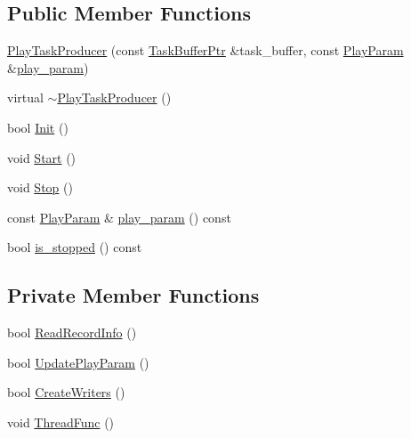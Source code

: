 \subsection*{Public Member Functions}
\begin{DoxyCompactItemize}
\item 
\hyperlink{classapollo_1_1cyber_1_1record_1_1PlayTaskProducer_a66e6a04b3f690355e593465aeb9ef1e0}{Play\-Task\-Producer} (const \hyperlink{classapollo_1_1cyber_1_1record_1_1PlayTaskProducer_a1a4a252c8c244a445f580a9c768c017d}{Task\-Buffer\-Ptr} \&task\-\_\-buffer, const \hyperlink{structapollo_1_1cyber_1_1record_1_1PlayParam}{Play\-Param} \&\hyperlink{classapollo_1_1cyber_1_1record_1_1PlayTaskProducer_a39ca7aec4622d5cd4abdc8805748ba7d}{play\-\_\-param})
\item 
virtual \hyperlink{classapollo_1_1cyber_1_1record_1_1PlayTaskProducer_a4dbc2e89ca8c92782ff8d4a527b17ed4}{$\sim$\-Play\-Task\-Producer} ()
\item 
bool \hyperlink{classapollo_1_1cyber_1_1record_1_1PlayTaskProducer_a2dfd444aad1c481bddda51d5d5b4e4f1}{Init} ()
\item 
void \hyperlink{classapollo_1_1cyber_1_1record_1_1PlayTaskProducer_a9f2d67183e461ff515a3dc10a9a0426e}{Start} ()
\item 
void \hyperlink{classapollo_1_1cyber_1_1record_1_1PlayTaskProducer_a158e6eaad01b4e2a0e7492582d135724}{Stop} ()
\item 
const \hyperlink{structapollo_1_1cyber_1_1record_1_1PlayParam}{Play\-Param} \& \hyperlink{classapollo_1_1cyber_1_1record_1_1PlayTaskProducer_a39ca7aec4622d5cd4abdc8805748ba7d}{play\-\_\-param} () const 
\item 
bool \hyperlink{classapollo_1_1cyber_1_1record_1_1PlayTaskProducer_a4c0a12788529f3146a9f474030e4fca3}{is\-\_\-stopped} () const 
\end{DoxyCompactItemize}
\subsection*{Private Member Functions}
\begin{DoxyCompactItemize}
\item 
bool \hyperlink{classapollo_1_1cyber_1_1record_1_1PlayTaskProducer_a542b9714f11d1d95fd455b3514549c0d}{Read\-Record\-Info} ()
\item 
bool \hyperlink{classapollo_1_1cyber_1_1record_1_1PlayTaskProducer_a0258c4db3fb860b3d66fe1a328c13249}{Update\-Play\-Param} ()
\item 
bool \hyperlink{classapollo_1_1cyber_1_1record_1_1PlayTaskProducer_a3f11303f16726816adce4fea8cb3b6c0}{Create\-Writers} ()
\item 
void \hyperlink{classapollo_1_1cyber_1_1record_1_1PlayTaskProducer_ac53d8915deeb967d327ea3ef6357bff2}{Thread\-Func} ()
\end{DoxyCompactItemize}
